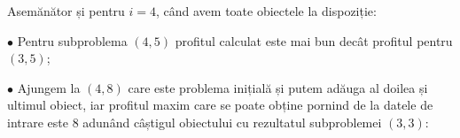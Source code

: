 \begin{sloppypar}

Asemănător și pentru $i = 4$, când avem toate obiectele la dispoziție: \par
$\bullet$ Pentru subproblema $(4, 5)$ profitul calculat este mai bun decât profitul pentru $(3, 5)$; \par
$\bullet$ Ajungem la $(4, 8)$ care este problema inițială și putem adăuga al doilea și ultimul obiect, iar profitul maxim care se poate obține pornind de la datele de intrare este 8 adunând câștigul obiectului cu rezultatul subproblemei $(3, 3)$:


\par


\end{sloppypar}
